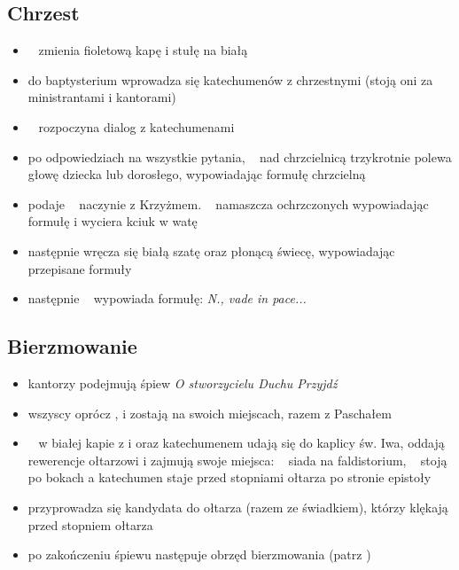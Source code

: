 \subsection{Chrzest}
\begin{itemize}
	\item \ii~ zmienia fioletową kapę i stułę na białą
	\item do baptysterium wprowadza się katechumenów z chrzestnymi (stoją oni za
	      ministrantami i kantorami)
	\item \ii~ rozpoczyna dialog z katechumenami
	\item po odpowiedziach na wszystkie pytania, \ii~ nad chrzcielnicą
	      trzykrotnie polewa głowę dziecka lub dorosłego, wypowiadając formułę
	      chrzcielną
	\item {} podaje \ii~ naczynie z Krzyżmem. \ii~ namaszcza ochrzczonych
	      wypowiadając formułę i wyciera kciuk w watę
	\item następnie wręcza się białą szatę oraz płonącą świecę, wypowiadając
	      przepisane formuły
	\item następnie \ii~ wypowiada formułę: \textit{N., vade in pace...}
\end{itemize}
\subsection{Bierzmowanie}
\begin{itemize}
	\item kantorzy podejmują śpiew \textit{O stworzycielu Duchu Przyjdź}
	\item wszyscy oprócz \ii,  i  zostają na swoich miejscach, razem z
	      Paschałem
	\item \ii~ w białej kapie z  i  oraz katechumenem udają się do
	      kaplicy św. Iwa, oddają rewerencje ołtarzowi i zajmują swoje miejsca:
	      \ii~ siada na faldistorium, \cc\cc~ stoją po bokach a katechumen staje
	      przed stopniami ołtarza po stronie epistoły
	\item przyprowadza się kandydata do ołtarza (razem ze świadkiem), którzy
	      klękają przed stopniem ołtarza
	\item po zakończeniu śpiewu następuje obrzęd bierzmowania (patrz
	      \textit{})
\end{itemize}
